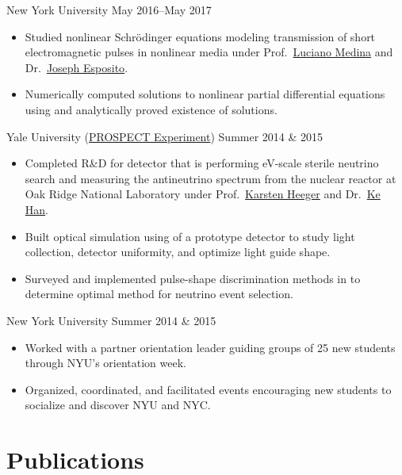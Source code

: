 \documentclass{cultvoucher}
\begin{document}
{New York University}
{May 2016--May 2017}
\begin{itemize}
	\vspace{-0.25em}
	\item Studied nonlinear Schr\"{o}dinger equations modeling transmission of short electromagnetic pulses in nonlinear media under Prof.\ \href{https://www.sites.google.com/a/nyu.edu/luciano-medina/}{Luciano Medina} and Dr.\ \href{https://cims.nyu.edu/~esposito/}{Joseph Esposito}.
	\item Numerically computed solutions to nonlinear partial differential equations using  and analytically proved existence of solutions.
\end{itemize}

{Yale University (\href{http://prospect.yale.edu/}{\small{PROSPECT Experiment}})}
{Summer 2014 \& 2015}
\begin{itemize}
	\vspace{-0.25em}
	\item Completed R\&D for detector that is performing eV-scale sterile neutrino search and measuring the antineutrino spectrum from the nuclear reactor at Oak Ridge National Laboratory under Prof.\ \href{http://heegerlab.yale.edu/karsten-heeger}{Karsten Heeger} and Dr.\ \href{https://www.physics.sjtu.edu.cn/en/people/1/kehan}{Ke Han}.
	\item Built optical simulation using  of a prototype detector to study light collection, detector uniformity, and optimize light guide shape.
	\item Surveyed and implemented pulse-shape discrimination methods in  to determine optimal method for neutrino event selection.
\end{itemize}

{New York University}
{Summer 2014 \& 2015}
\begin{itemize}
	\vspace{-0.25em}
	\item Worked with a partner orientation leader guiding groups of 25 new students through NYU's orientation week.
	\item Organized, coordinated, and facilitated events encouraging new students to socialize and discover NYU and NYC.
\end{itemize}

\section{Publications}
\end{document}
